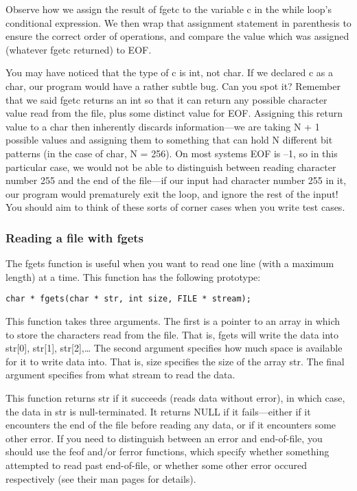 \documentclass[11pt, a4paper]{article}
\begin{document}
Observe how we assign the result of fgetc to the variable c in the while loop’s conditional expression. We then wrap that assignment statement in parenthesis to ensure the correct order of operations, and compare the value which was assigned (whatever fgetc returned) to EOF.

You may have noticed that the type of c is int, not char. If we declared c as a char, our program would have a rather subtle bug. Can you spot it? Remember that we said fgetc returns an int so that it can return any possible character value read from the file, plus some distinct value for EOF. Assigning this return value to a char then inherently discards information—we are taking N + 1 possible values and assigning them to something that can hold N different bit patterns (in the case of char, N = 256). On most systems EOF is –1, so in this particular case, we would not be able to distinguish between reading character number 255 and the end of the file—if our input had character number 255 in it, our program would prematurely exit the loop, and ignore the rest of the input! You should aim to think of these sorts of corner cases when you write test cases.



\subsubsection{Reading a file with fgets}%
\label{ssub:reading_a_file_with_fgets}

The fgets function is useful when you want to read one line (with a maximum length) at a time. This function has the following prototype:

\texttt{char * fgets(char * str, int size, FILE * stream);} 


This function takes three arguments. The first is a pointer to an array in which to store the characters read from the file. That is, fgets will write the data into str[0], str[1], str[2],… The second argument specifies how much space is available for it to write data into. That is, size specifies the size of the array str. The final argument specifies from what stream to read the data.

This function returns str if it succeeds (reads data without error), in which case, the data in str is null-terminated. It returns NULL if it fails—either if it encounters the end of the file before reading any data, or if it encounters some other error. If you need to distinguish between an error and end-of-file, you should use the feof and/or ferror functions, which specify whether something attempted to read past end-of-file, or whether some other error occured respectively (see their man pages for details).
\end{document}
